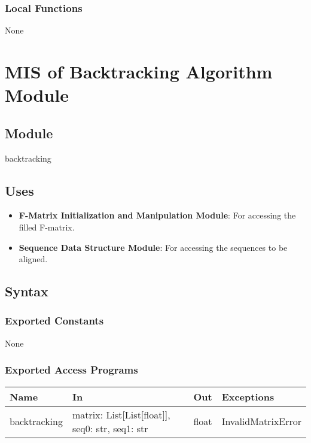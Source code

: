 \documentclass[12pt, titlepage]{article}
\begin{document}
\subsubsection{Local Functions}

None

\newpage
\section{MIS of Backtracking Algorithm Module} \label{mBA}

\subsection{Module}

backtracking

\subsection{Uses}

\begin{itemize}
    \item \textbf{F-Matrix Initialization and Manipulation Module}: For accessing the filled F-matrix.
    \item \textbf{Sequence Data Structure Module}: For accessing the sequences to be aligned.
\end{itemize}

\subsection{Syntax}

\subsubsection{Exported Constants}

None

\subsubsection{Exported Access Programs}

\begin{center}
\begin{tabular}{p{4cm} p{4cm} p{3cm} p{2cm}}
\hline
\textbf{Name} & \textbf{In} & \textbf{Out} & \textbf{Exceptions} \\
\hline
backtracking & matrix: List[List[float]], seq0: str, seq1: str & float & InvalidMatrixError \\
\hline
\end{tabular}
\end{center}
\end{document}
